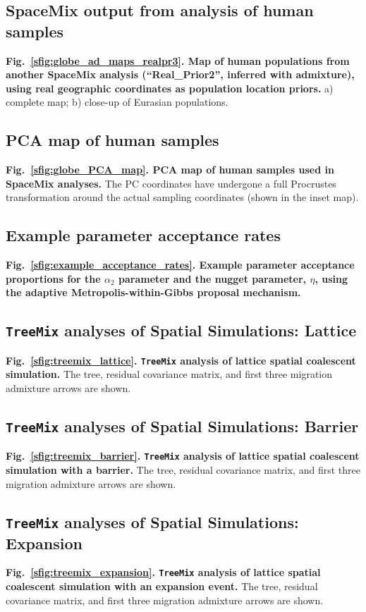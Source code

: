 \documentclass[10pt,letterpaper]{article}
\begin{document}
\subsection*{SpaceMix output from analysis of human samples}
\label{globe_ad_maps_realpr3}
{\bf{Fig.\ \ref{sfig:globe_ad_maps_realpr3}. Map of human populations from another SpaceMix analysis (``Real\_Prior2'',  inferred with admixture), using real geographic coordinates as population location priors.}}  a) complete map; b) close-up of Eurasian populations.

\subsection*{PCA map of human samples}
\label{globe_PCA_map}
{\bf{Fig.\ \ref{sfig:globe_PCA_map}. PCA map of human samples used in SpaceMix analyses.}} The PC coordinates have undergone a full Procrustes transformation around the actual sampling coordinates (shown in the inset map).

\subsection*{Example parameter acceptance rates}
\label{example_acceptance_rates}
{\bf{Fig.\ \ref{sfig:example_acceptance_rates}. Example parameter acceptance proportions for the $\alpha_2$ parameter and the nugget parameter, $\eta$, using the adaptive Metropolis-within-Gibbs proposal mechanism.}}

\subsection*{\texttt{TreeMix} analyses of Spatial Simulations: Lattice}
\label{treemix_lattice}
{\bf{Fig.\ \ref{sfig:treemix_lattice}. \texttt{TreeMix} analysis of lattice spatial coalescent simulation.}}  
The tree, residual covariance matrix, and first three migration admixture arrows are shown.

\subsection*{\texttt{TreeMix} analyses of Spatial Simulations: Barrier}
\label{treemix_barrier}
{\bf{Fig.\ \ref{sfig:treemix_barrier}. \texttt{TreeMix} analysis of lattice spatial coalescent simulation with a barrier.}}
The tree, residual covariance matrix, and first three migration admixture arrows are shown.

\subsection*{\texttt{TreeMix} analyses of Spatial Simulations: Expansion}
\label{treemix_expansion}
{\bf{Fig.\ \ref{sfig:treemix_expansion}. \texttt{TreeMix} analysis of lattice spatial coalescent simulation with an expansion event.}}
The tree, residual covariance matrix, and first three migration admixture arrows are shown.
\end{document}

